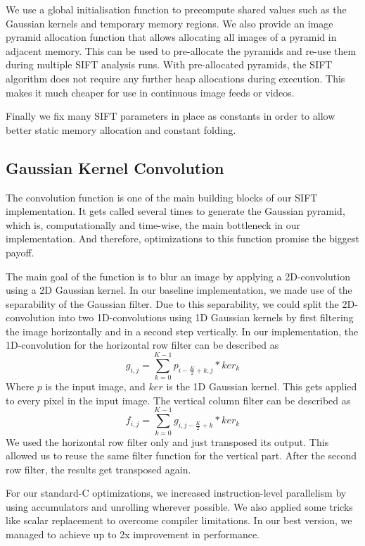 \documentclass[letterpaper]{article}
\begin{document}
We use a global initialisation function to precompute shared values such as the Gaussian kernels and temporary memory regions. We also provide an image pyramid allocation function that allows allocating all images of a pyramid in adjacent memory. This can be used to pre-allocate the pyramids and re-use them during multiple SIFT analysis runs. With pre-allocated pyramids, the SIFT algorithm does not require any further heap allocations during execution. This makes it much cheaper for use in continuous image feeds or videos.

Finally we fix many SIFT parameters in place as constants in order to allow better static memory allocation and constant folding.

\subsection*{Gaussian Kernel Convolution}\label{sec:convolution}
The convolution function is one of the main building blocks of our SIFT implementation. It gets called several times to generate the Gaussian pyramid, which is, computationally and time-wise, the main bottleneck in our implementation. And therefore, optimizations to this function promise the biggest payoff.

The main goal of the function is to blur an image by applying a 2D-convolution using a 2D Gaussian kernel. In our baseline implementation, we made use of the separability of the Gaussian filter. Due to this separability, we could split the 2D-convolution into two 1D-convolutions using 1D Gaussian kernels by first filtering the image horizontally and in a second step vertically. In our implementation, the 1D-convolution for the horizontal row filter can be described as
\begin{equation}\label{eq_h}
    g_{i,j} = \sum_{k=0}^{K-1} p_{i-\frac{K}{2}+k,j} * ker_{k}
\end{equation}
Where $p$ is the input image, and $ker$ is the 1D Gaussian kernel. This gets applied to every pixel in the input image. The vertical column filter can be described as
\begin{equation}\label{eq_v}
    f_{i,j} = \sum_{k=0}^{K-1} g_{i,j-\frac{K}{2}+k} * ker_{k}
\end{equation}
We used the horizontal row filter only and just transposed its output. This allowed us to reuse the same filter function for the vertical part. After the second row filter, the results get transposed again.

For our standard-C optimizations, we increased instruction-level parallelism by using accumulators and unrolling wherever possible. We also applied some tricks like scalar replacement to overcome compiler limitations. In our best version, we managed to achieve up to 2x improvement in performance.
\end{document}
